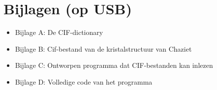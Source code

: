 \chapter*{Bijlagen (op USB)}

\begin{itemize}  

\item Bijlage A: \qquad	De CIF-dictionary 

\item Bijlage B: \qquad	Cif-bestand van de kristalstructuur van Chaziet  

\item Bijlage C: \qquad	Ontworpen programma dat CIF-bestanden kan inlezen

\item Bijlage D: \qquad	Volledige code van het programma 
\end{itemize}


